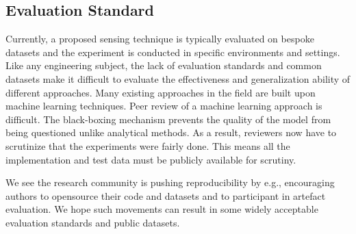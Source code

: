 
\subsection{Evaluation Standard}
Currently, a proposed sensing technique is typically evaluated on bespoke datasets and the experiment is conducted in specific environments
and settings. Like any engineering subject, the lack of evaluation standards and common datasets make it difficult to evaluate the
effectiveness and generalization ability of different approaches. Many existing approaches in the field are built upon machine learning
techniques. Peer review of a machine learning approach is difficult. The black-boxing mechanism prevents the quality of the model from
being questioned unlike analytical methods. As a result, reviewers now have to scrutinize that the experiments were fairly done. This means
all the implementation and test data must be publicly available for scrutiny.

We see the research community is pushing reproducibility by e.g., encouraging authors to opensource their code and datasets and to
participant in artefact evaluation. We hope such movements can result in some widely acceptable evaluation standards and public datasets.


